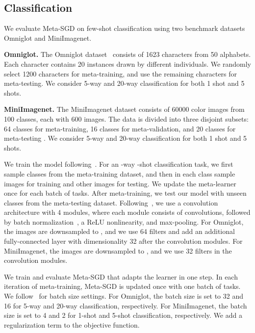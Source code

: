 \documentclass{article}
\begin{document}
 
\subsection{Classification}



We evaluate Meta-SGD on few-shot classification using two benchmark datasets Omniglot and MiniImagenet.


\noindent\textbf{Omniglot.} The Omniglot dataset~\cite{lake2011one} consists of 1623 characters from 50 alphabets. Each character contains 20 instances drawn by different individuals. We randomly select 1200 characters for meta-training, and use the remaining characters for meta-testing. We consider 5-way and 20-way classification for both 1 shot and 5 shots.

\noindent\textbf{MiniImagenet.} The MiniImagenet dataset consists of 60000 color images from 100 classes, each with 600 images. The data is divided into three disjoint subsets: 64 classes for meta-training,
16 classes for meta-validation, and 20 classes for meta-testing \cite{ravi2017optimization}. We consider 5-way and 20-way classification for both 1 shot and 5 shots.


We train the model following~\cite{vinyals2016matching}. For an -way -shot classification task, we first sample  classes from the meta-training dataset, and then in each class sample  images for training and  other images for testing. We update the meta-learner once for each batch of tasks. After meta-training, we test our model with unseen classes from the meta-testing dataset.
Following~\cite{finn2017model}, we use a convolution architecture with 4 modules, where each module consists of  convolutions, followed by batch
normalization~\cite{ioffe2015batch}, a ReLU nonlinearity, and  max-pooling.
For Omniglot, the images are downsampled to , and we use 64 filters and add an additional fully-connected layer with dimensionality 32 after the convolution modules.
For MiniImagenet, the images are downsampled to , and we use 32 filters in the convolution modules.

We train and evaluate Meta-SGD that adapts the learner in one step.
In each iteration of meta-training, Meta-SGD is updated once with one batch of tasks.
We follow~\cite{finn2017model} for batch size settings. For Omniglot, the batch size is set to 32 and 16 for 5-way and 20-way classification, respectively. For MiniImagenet, the batch size is set to 4 and 2 for 1-shot and 5-shot classification, respectively. We add a regularization term to the objective function. 
\end{document}
